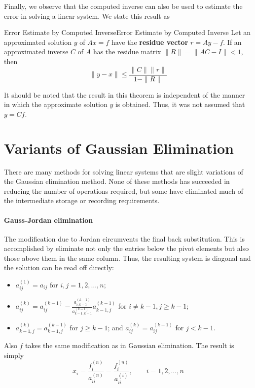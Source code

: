 \documentclass[../main.tex]{subfiles}
\begin{document}
Finally, we observe that the computed inverse can also be used to estimate the error in solving a linear system. We state this result as
\begin{theorem}{Error Estimate by Computed Inverse}{Error Estimate by Computed Inverse}
	Let an approximated solution $y$ of $A x = f$ have the \textbf{residue vector} $r = A y - f$. If an approximated inverse $C$ of $A$ has the residue matrix $\| R \| = \| A C - I \| < 1$, then
	\begin{equation*}
		\| y - x \| \leq \frac{\| C \| \| r \|}{1 - \| R \|}
	\end{equation*}
\end{theorem}

\begin{remark}
	It should be noted that the result in this theorem is independent of the manner in which the approximate solution $y$ is obtained. Thus, it was not assumed that $y = C f$.
\end{remark}

\section{Variants of Gaussian Elimination}
There are many methods for solving linear systems that are slight variations of the Gaussian elimination method. None of these methods has succeeded in reducing the number of operations required, but some have eliminated much of the intermediate storage or recording requirements.

\paragraph{Gauss-Jordan elimination} The modification due to Jordan circumvents the final back substitution. This is accomplished by eliminate not only the entries below the pivot elements but also those above them in the same column. Thus, the resulting system is diagonal and the solution can be read off directly:
\begin{itemize}
	\item $ a_{ij}^{(1)} = a_{ij} $ for $i, j = 1, 2, \ldots, n$;
	\item $\displaystyle a_{ij}^{(k)} = a_{ij}^{(k-1)} - \frac{a_{i,k-1}^{(k-1)}}{a_{k-1, k-1}^{(k-1)}} a_{k-1, j}^{(k-1)}$ for $i \neq k-1, j \geq k-1$;
	\item $a_{k-1, j}^{(k)} = a_{k-1, j}^{(k-1)}$ for $j \geq k-1$; and $a_{ij}^{(k)} = a_{ij}^{(k-1)}$ for $j < k-1$.
\end{itemize}
Also $f$ takes the same modification as in Gaussian elimination. The result is simply
\begin{equation*}
	x_i = \frac{f_i^{(n)}}{a_{ii}^{(n)}} = \frac{f_i^{(n)}}{a_{ii}^{(i)}}, \qquad i = 1, 2, \ldots, n
\end{equation*}
\end{document}
